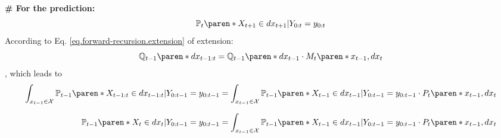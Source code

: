 \textbf{\# For the prediction:} \label{appendix.sec.bootstrap-prediction}
%
\begin{equation*}
    \mathbb{P}_{t} \paren*{ X_{t+1} \in dx_{t+1} \vert Y_{0:t} = y_{0:t} }
\end{equation*}
%
According to Eq. \eqref{eq.forward-recursion.extension} of extension:
%
\begin{equation*}
    \mathbb{Q}_{t-1} \paren*{dx_{t-1:t}} =
        \mathbb{Q}_{t-1} \paren*{dx_{t-1}}
        \cdot M_{t} \paren*{x_{t-1}, dx_{t}}
\end{equation*}
%
, which leads to
%
\begin{align*}
    \int_{x_{t-1} \in \mathcal{X}} \mathbb{P}_{t-1}
        \paren*{ X_{t-1:t} \in dx_{t-1:t} \vert Y_{0:t-1} = y_{0:t-1}}
    &=
        \int_{x_{t-1} \in \mathcal{X}} \mathbb{P}_{t-1}
        \paren*{ X_{t-1} \in dx_{t-1} \vert Y_{0:t-1} = y_{0:t-1}}
        \cdot P_{t} \paren*{x_{t-1}, dx_{t}}
    \\[1.5ex]
    \mathbb{P}_{t-1}
        \paren*{ X_{t} \in dx_{t} \vert Y_{0:t-1} = y_{0:t-1}}
    &=
        \int_{x_{t-1} \in \mathcal{X}} \mathbb{P}_{t-1}
        \paren*{ X_{t-1} \in dx_{t-1} \vert Y_{0:t-1} = y_{0:t-1}}
        \cdot P_{t} \paren*{x_{t-1}, dx_{t}}
\end{align*}
